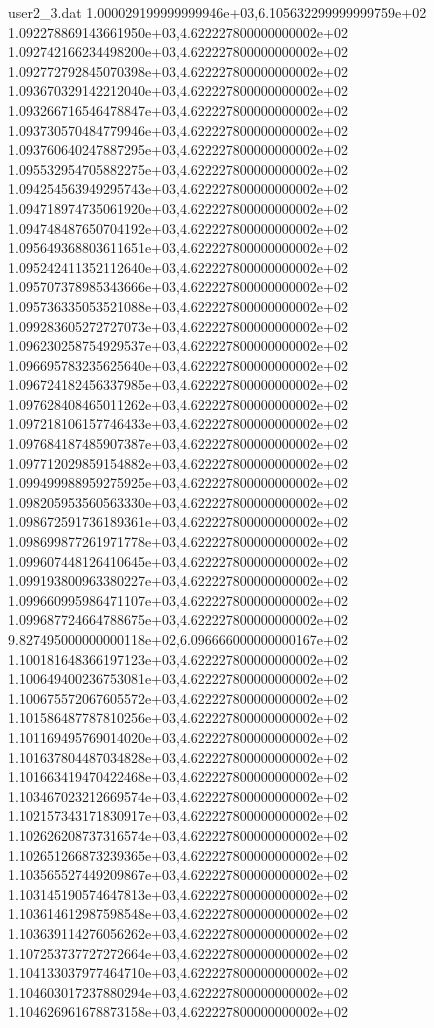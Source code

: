 \begin{filecontents}{user2_3.dat}
1.000029199999999946e+03,6.105632299999999759e+02
1.092278869143661950e+03,4.622227800000000002e+02
1.092742166234498200e+03,4.622227800000000002e+02
1.092772792845070398e+03,4.622227800000000002e+02
1.093670329142212040e+03,4.622227800000000002e+02
1.093266716546478847e+03,4.622227800000000002e+02
1.093730570484779946e+03,4.622227800000000002e+02
1.093760640247887295e+03,4.622227800000000002e+02
1.095532954705882275e+03,4.622227800000000002e+02
1.094254563949295743e+03,4.622227800000000002e+02
1.094718974735061920e+03,4.622227800000000002e+02
1.094748487650704192e+03,4.622227800000000002e+02
1.095649368803611651e+03,4.622227800000000002e+02
1.095242411352112640e+03,4.622227800000000002e+02
1.095707378985343666e+03,4.622227800000000002e+02
1.095736335053521088e+03,4.622227800000000002e+02
1.099283605272727073e+03,4.622227800000000002e+02
1.096230258754929537e+03,4.622227800000000002e+02
1.096695783235625640e+03,4.622227800000000002e+02
1.096724182456337985e+03,4.622227800000000002e+02
1.097628408465011262e+03,4.622227800000000002e+02
1.097218106157746433e+03,4.622227800000000002e+02
1.097684187485907387e+03,4.622227800000000002e+02
1.097712029859154882e+03,4.622227800000000002e+02
1.099499988959275925e+03,4.622227800000000002e+02
1.098205953560563330e+03,4.622227800000000002e+02
1.098672591736189361e+03,4.622227800000000002e+02
1.098699877261971778e+03,4.622227800000000002e+02
1.099607448126410645e+03,4.622227800000000002e+02
1.099193800963380227e+03,4.622227800000000002e+02
1.099660995986471107e+03,4.622227800000000002e+02
1.099687724664788675e+03,4.622227800000000002e+02
9.827495000000000118e+02,6.096666000000000167e+02
1.100181648366197123e+03,4.622227800000000002e+02
1.100649400236753081e+03,4.622227800000000002e+02
1.100675572067605572e+03,4.622227800000000002e+02
1.101586487787810256e+03,4.622227800000000002e+02
1.101169495769014020e+03,4.622227800000000002e+02
1.101637804487034828e+03,4.622227800000000002e+02
1.101663419470422468e+03,4.622227800000000002e+02
1.103467023212669574e+03,4.622227800000000002e+02
1.102157343171830917e+03,4.622227800000000002e+02
1.102626208737316574e+03,4.622227800000000002e+02
1.102651266873239365e+03,4.622227800000000002e+02
1.103565527449209867e+03,4.622227800000000002e+02
1.103145190574647813e+03,4.622227800000000002e+02
1.103614612987598548e+03,4.622227800000000002e+02
1.103639114276056262e+03,4.622227800000000002e+02
1.107253737727272664e+03,4.622227800000000002e+02
1.104133037977464710e+03,4.622227800000000002e+02
1.104603017237880294e+03,4.622227800000000002e+02
1.104626961678873158e+03,4.622227800000000002e+02

\end{filecontents}
